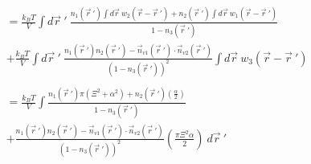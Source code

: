 \documentclass[double,12pt]{beavtex}
\begin{document}
\begin{align} %
          &= \frac{k_BT}{V} \int d\vec r~'~ \frac{n_1(\vec r~')\int d \vec r
           ~w_2(\vec r - \vec r~')
          +n_2(\vec r~')\int d \vec r ~w_1(\vec r - \vec r~')}
          {1-n_3(\vec r~')} \nonumber\\
          &+\frac{k_BT}{V} \int d\vec r~'~\frac{n_1(\vec r~')n_2(\vec r~')
          -\vec n_{v1}(\vec r~')
          \cdot \vec n_{v2}(\vec r~')}{(1-n_3(\vec r~'))^2} \int d \vec r 
          ~w_3(\vec r - \vec r~') \\ \nonumber \\
%
           &= \frac{k_BT}{V}\int  \frac{n_1(\vec r~')
           \pi(\Xi^2 + \alpha^2)
          +n_2(\vec r~')\left(\frac{\alpha}{2}\right)}{1-n_3(\vec r~')} 
          \nonumber \\
          &+ \frac{n_1(\vec r~')n_2(\vec r~')
          -\vec n_{v1}(\vec r~')
          \cdot \vec n_{v2}(\vec r~')}{(1-n_3(\vec r~'))^2}
          \left(\frac{\pi\Xi^2\alpha}{2}\right)   ~d\vec r~'
\end{align}
\end{document}
